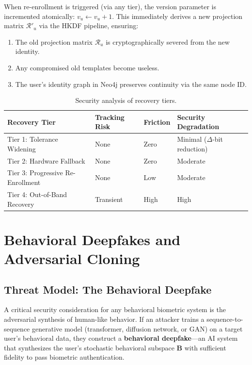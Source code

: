 \documentclass[11pt,twoside]{amsart}
\theoremstyle{plain}
\theoremstyle{definition}
\theoremstyle{remark}
\newcommand{\bB}{\mathbf{B}}
\newcommand{\calR}{\mathcal{R}}
\begin{document}
When re-enrollment is triggered (via any tier), the version parameter is incremented atomically: $v_u \leftarrow v_u + 1$. This immediately derives a new projection matrix $\calR'_u$ via the HKDF pipeline, ensuring:
\begin{enumerate}
    \item The old projection matrix $\calR_u$ is cryptographically severed from the new identity.
    \item Any compromised old templates become useless.
    \item The user's identity graph in Neo4j preserves continuity via the same node ID.
\end{enumerate}

\begin{table}[htbp]
\centering
\caption{Security analysis of recovery tiers.}
\label{tab:recovery}
\begin{tabular}{@{}p{3.5cm}p{3cm}p{2.5cm}p{3.5cm}@{}}
\toprule
\textbf{Recovery Tier} & \textbf{Tracking Risk} & \textbf{Friction} & \textbf{Security Degradation} \\
\midrule
Tier 1: Tolerance Widening & None & Zero & Minimal ($\Delta$-bit reduction) \\
Tier 2: Hardware Fallback & None & Zero & Moderate \\
Tier 3: Progressive Re-Enrollment & None & Low & Moderate \\
Tier 4: Out-of-Band Recovery & Transient & High & High \\
\bottomrule
\end{tabular}
\end{table}

\section{Behavioral Deepfakes and Adversarial Cloning}

\subsection{Threat Model: The Behavioral Deepfake}

A critical security consideration for any behavioral biometric system is the adversarial synthesis of human-like behavior. If an attacker trains a sequence-to-sequence generative model (transformer, diffusion network, or GAN) on a target user's behavioral data, they construct a \textbf{behavioral deepfake}---an AI system that synthesizes the user's stochastic behavioral subspace $\bB$ with sufficient fidelity to pass biometric authentication.
\end{document}
